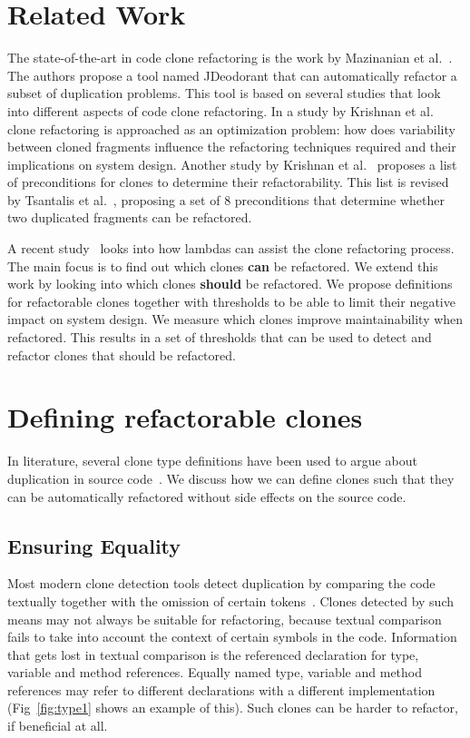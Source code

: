 \documentclass[conference]{IEEEtran}
\begin{document}
\section{Related Work}
The state-of-the-art in code clone refactoring is the work by Mazinanian et al.~\cite{mazinanian2016jdeodorant}. The authors propose a tool named JDeodorant that can automatically refactor a subset of duplication problems. This tool is based on several studies that look into different aspects of code clone refactoring. In a study by Krishnan et al.~\cite{krishnan2013refactoring} clone refactoring is approached as an optimization problem: how does variability between cloned fragments influence the refactoring techniques required and their implications on system design. Another study by Krishnan et al.~\cite{krishnan2014unification} proposes a list of preconditions for clones to determine their refactorability. This list is revised by Tsantalis et al.~\cite{tsantalis2015assessing}, proposing a set of 8 preconditions that determine whether two duplicated fragments can be refactored.

A recent study~\cite{tsantalis2017clone} looks into how lambdas can assist the clone refactoring process. The main focus is to find out which clones \textbf{can} be refactored. We extend this work by looking into which clones \textbf{should} be refactored. We propose definitions for refactorable clones together with thresholds to be able to limit their negative impact on system design. We measure which clones improve maintainability when refactored. This results in a set of thresholds that can be used to detect and refactor clones that should be refactored.

\section{Defining refactorable clones}
In literature, several clone type definitions have been used to argue about duplication in source code~\cite{roy2007survey}. We discuss how we can define clones such that they can be automatically refactored without side effects on the source code.

\subsection{Ensuring Equality}\label{sec:t1r}
Most modern clone detection tools detect duplication by comparing the code textually together with the omission of certain tokens~\cite{roy2009comparison, svajlenko2014evaluating}. Clones detected by such means may not always be suitable for refactoring, because textual comparison fails to take into account the context of certain symbols in the code. Information that gets lost in textual comparison is the referenced declaration for type, variable and method references. Equally named type, variable and method references may refer to different declarations with a different implementation (Fig~\ref{fig:type1} shows an example of this). Such clones can be harder to refactor, if beneficial at all.
\end{document}
